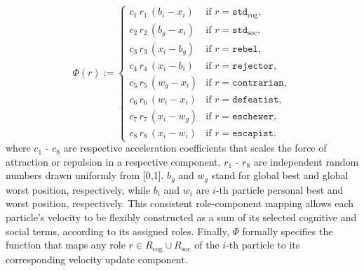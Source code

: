 {%
\begin{equation}
\Phi(r) := 
\begin{cases}
c_1\, r_1\, (b_i - x_i) 
    & \text{if } r = \texttt{std}_\text{cog}, \\
c_2\, r_2\, (b_g - x_i) 
    & \text{if } r = \texttt{std}_\text{soc}, \\
c_3\, r_3\, (x_i - b_g) 
    & \text{if } r = \texttt{rebel}, \\
c_4\, r_4\, (x_i - b_i) 
    & \text{if } r = \texttt{rejector}, \\
c_5\, r_5\, (w_g - x_i) 
    & \text{if } r = \texttt{contrarian}, \\
c_6\, r_6\, (w_i - x_i) 
    & \text{if } r = \texttt{defeatist}, \\
c_7\, r_7\, (x_i - w_g) 
    & \text{if } r = \texttt{eschewer}, \\
c_8\, r_8\, (x_i - w_i) 
    & \text{if } r = \texttt{escapist}.
\end{cases}
\end{equation}
where $c_1$ - $c_8$ are respective acceleration coefficients that scales the force of attraction or repulsion in a respective component. $r_1$ - $r_8$ are independent random numbers drawn uniformly from [0,1]. $b_{g}$ and $w_{g}$ stand for global best and global worst position, respectively, while $b_{i}$ and $w_{i}$ are $i$-th particle personal best and worst position, respectively. This consistent role-component mapping allows each particle’s velocity to be flexibly constructed as a sum of its selected cognitive and social terms, according to its assigned roles. Finally, \(\Phi\) formally specifies the function that maps any role \( r \in R_\text{cog} \cup R_\text{soc} \) of the \( i \)-th particle to its corresponding  velocity update component.






}
